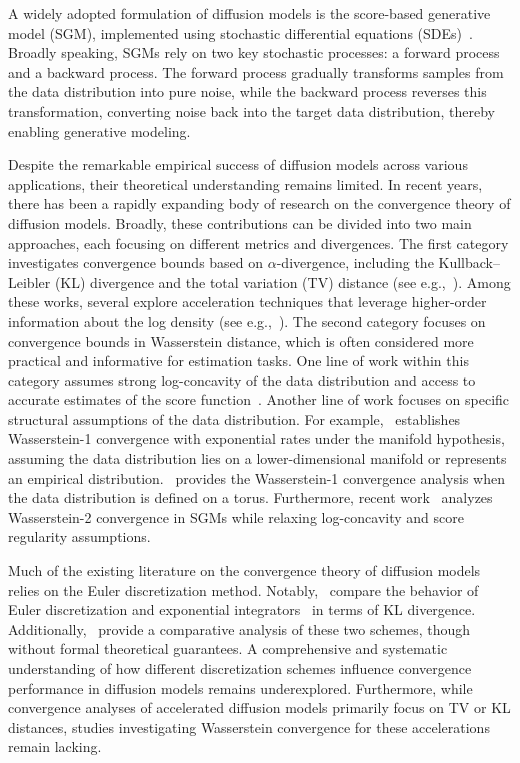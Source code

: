 \documentclass[11pt]{article}
\begin{document}
A widely adopted formulation of diffusion models is the score-based generative model (SGM), implemented using stochastic differential equations (SDEs)~\cite{song2020score}. Broadly speaking, SGMs rely on two key stochastic processes: a forward process and a backward process. The forward process gradually transforms samples from the data distribution into pure noise, while the backward process reverses this transformation, converting noise back into the target data distribution, thereby enabling generative modeling. 

Despite the remarkable empirical success of diffusion models across various applications, their theoretical understanding remains limited. In recent years, there has been a rapidly expanding body of research on the convergence theory of diffusion models. Broadly, these contributions can be divided into two main approaches, each focusing on different metrics and divergences.
The first category investigates convergence bounds based on $\alpha$-divergence, including the Kullback–Leibler (KL) divergence and the total variation (TV) distance (see e.g.,~\cite{li2024provable,liang2025low,chen2024probability,chen2022sampling,wu2024stochastic,chen2023improved}). 
Among these works, several explore acceleration techniques that leverage higher-order information about the log density (see e.g.,~\cite{li2024accelerating,liang2024broadening,huang2024convergence}).
The second category focuses on convergence bounds in Wasserstein distance, which is often considered more practical and informative for estimation tasks.
One line of work within this category assumes strong log-concavity of the data distribution and access to accurate estimates of the score function~\cite{gao2023wasserstein,gao2023wasserstein,bruno2023diffusion,tang2024contractive,strasman2024analysis}. Another line of work focuses on specific structural assumptions of the data distribution.
For example,~\cite{de2022convergence} establishes Wasserstein-1 convergence with exponential rates under the manifold hypothesis, assuming the data distribution lies on a lower-dimensional manifold or represents an empirical distribution.~\cite{mimikos2024score} provides the Wasserstein-1 convergence analysis when the data distribution is defined on a torus.
Furthermore, recent work~\cite{gentiloni2025beyond} analyzes Wasserstein-2 convergence in SGMs while relaxing log-concavity and score regularity assumptions.

Much of the existing literature on the convergence theory of diffusion models relies on the Euler discretization method. 
Notably,~\cite{chen2023improved} compare the behavior of Euler discretization and exponential integrators~\cite{zhang2022fast,hochbruck2010exponential} in terms of KL divergence.
Additionally,~\cite{de2022convergence} provide a comparative analysis of these two schemes, though without formal theoretical guarantees.
A comprehensive and systematic understanding of how different discretization schemes influence convergence performance in diffusion models remains underexplored. 
Furthermore, while convergence analyses of accelerated diffusion models primarily focus on TV or KL distances, studies investigating Wasserstein convergence for these accelerations remain lacking.
\end{document}
